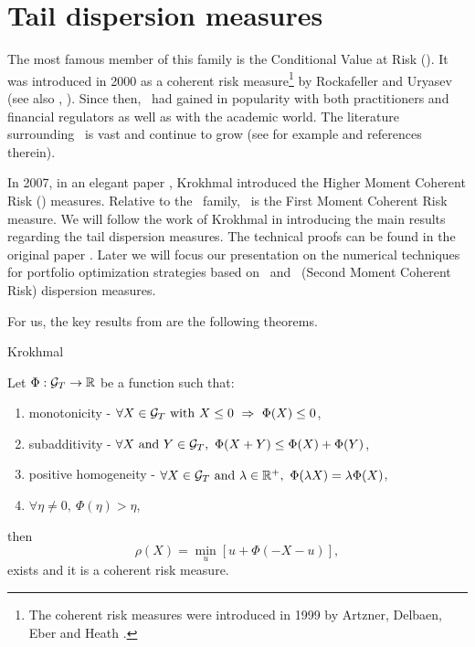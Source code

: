 
\section{Tail dispersion measures}

The most famous member of this family is the Conditional Value at Risk (\CVaR).
It was introduced in 2000 as a coherent risk measure\footnote{The coherent risk measures were introduced in 1999 by
Artzner, Delbaen, Eber and Heath \cite{Artzner}.} by Rockafeller and Uryasev \cite{Uryasev} (see also \cite{Pflug}, \cite{Uryasev2}).
Since then, \CVaR\ had gained in popularity with both practitioners and financial regulators
as well as with the academic world. The literature surrounding \CVaR\ is vast and
continue to grow (see for example \cite{Mansini} and references therein).

In 2007, in an elegant paper \cite{Krokhmal}, Krokhmal introduced the Higher Moment Coherent Risk (\HMCR) measures.
Relative to the \HMCR\ family, \CVaR\ is the First Moment Coherent Risk measure.
We will follow the work of Krokhmal in introducing the main results regarding the tail dispersion measures.
The technical proofs can be found in the original paper \cite{Krokhmal}.
Later we will focus our presentation on the numerical techniques for
portfolio optimization strategies based on \CVaR\ and \SMCR\ (Second Moment Coherent Risk) dispersion measures.

For us, the key results from \cite{Krokhmal} are the following theorems.
\begin{theorem}{Krokhmal}

  \noindent Let $\Phi:{\cal G}_T \rightarrow {\mathbb R}$ be a function such that:
  \begin{enumerate}
    \item monotonicity - $\forall X\in \cG_T\ \text{with}\ X \leq 0\ \Rightarrow\ \Phi(X) \leq 0$,
    \item subadditivity - $\forall X\ \text{and}\ Y \in \cG_T,\ \Phi(X + Y) \leq \Phi(X) + \Phi(Y)$,
    \item positive homogeneity - $\forall X\in{\cal G}_T\ \text{and}\ \lambda\in{\mathbb R}^+,\ \Phi(\lambda X) = \lambda\Phi(X)$,
    \item $\forall \eta\neq 0,\ \Phi(\eta) > \eta$,
  \end{enumerate}
  then
  \begin{equation}
    \rho(X) = \min_u \left[ u + \Phi\left(-X - u\right)\right],
  \end{equation}
  exists and it is a coherent risk measure.
\end{theorem}


